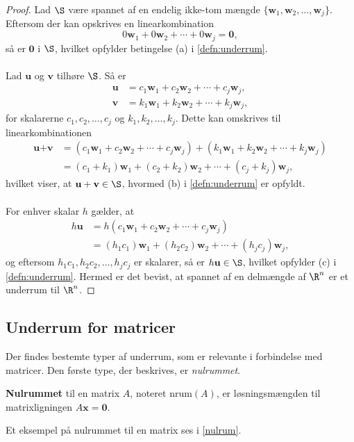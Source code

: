 \begin{proof}
Lad $\S$ være spannet af en endelig ikke-tom mængde 
$\{\textbf{w}_1 , \textbf{w}_2 , \ldots , \textbf{w}_j\}$.
Eftersom der kan opskrives en linearkombination 
$$0\textbf{w}_1 + 0\textbf{w}_2 + \cdots + 0\textbf{w}_j=\textbf{0},$$ 
så er $\textbf{0}$ i  $\S$, hvilket opfylder betingelse (a) i \ref{defn:underrum}.
\\\\
%
Lad $\textbf{u}$ og $\textbf{v}$ tilhøre $\S$. Så er
%
\begin{align*}
\textbf{u}&=c_1\textbf{w}_1+c_2\textbf{w}_2+\cdots+c_j\textbf{w}_j, \\ 
\textbf{v}&=k_1\textbf{w}_1+k_2\textbf{w}_2+\cdots+k_j\textbf{w}_j,
\end{align*}
%
for skalarerne $c_1,c_2,\ldots,c_j$ og $k_1,k_2,\ldots,k_j$. 
Dette kan omskrives til linearkombinationen
%
\begin{align*}
\textbf{u}+\textbf{v}&=(c_1\textbf{w}_1+c_2\textbf{w}_2+\cdots+c_j\textbf{w}_j)+(k_1\textbf{w}_1+k_2\textbf{w}_2+\cdots+k_j\textbf{w}_j)\\
&=(c_1+k_1)\textbf{w}_1+(c_2+k_2)\textbf{w}_2+\cdots+(c_j+k_j)\textbf{w}_j,
\end{align*}
hvilket viser, at $\textbf{u}+\textbf{v}\in \S$, hvormed (b) i \ref{defn:underrum} er opfyldt.
\\\\
For enhver skalar $h$ gælder, at
\begin{align*}
h\textbf{u}&=h(c_1\textbf{w}_1+c_2\textbf{w}_2+\cdots+c_j\textbf{w}_j)\\
&=(h_1c_1)\textbf{w}_1+(h_2c_2)\textbf{w}_2+\cdots+(h_jc_j)\textbf{w}_j,
\end{align*}
og eftersom $h_1c_1,h_2c_2,\ldots,h_jc_j$ er skalarer, så er $h\textbf{u}\in \S$, hvilket opfylder (c) i \ref{defn:underrum}.
Hermed er det bevist, at spannet af en delmængde af $\R^n$ er et underrum til $\R^n$.
\end{proof}

\subsection{Underrum for matricer}
Der findes bestemte typer af underrum, som er relevante i forbindelse med matricer. Den første type, der beskrives, er \textit{nulrummet}.
%
\begin{defn}{}{}
\textbf{Nulrummet} til en matrix $A$, noteret $\text{nrum}(A)$, er løsningsmængden til matrixligningen $A\textbf{x}=\textbf{0}$. 
\end{defn}
%
\noindent
Et eksempel på nulrummet til en matrix ses i \ref{nulrum}.


